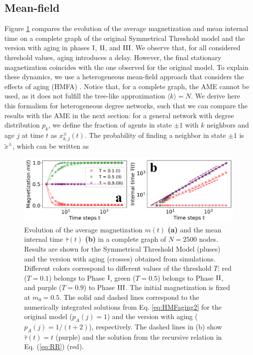\subsection{Mean-field}
Figure \ref{fig:COM_AGING} compares the evolution of the average magnetization and mean internal time on a complete graph of the original Symmetrical Threshold model and the version with aging in phases ${\rm I}$, ${\rm II}$, and ${\rm III}$. We observe that, for all considered threshold values, aging introduces a delay. However, the final stationary magnetization coincides with the one observed for the original model. To explain these dynamics, we use a heterogeneous mean-field approach that considers the effects of aging (HMFA) \cite{chen-2020}. Notice that, for a complete graph, the AME cannot be used, as it does not fulfill the tree-like approximation $\langle k \rangle = N$. We derive here this formalism for heterogeneous degree networks, such that we can compare the results with the AME in the next section: for a general network with degree distribution $p_k$, we define the fraction of agents in state $\pm 1$ with $k$ neighbors and age $j$ at time $t$ as $x^{\pm}_{k,j} (t)$. The probability of finding a neighbor in state $\pm 1$ is $\tilde{x}^{\pm}$, which can be written as 
\begin{figure}
	\centering \captionsetup{font=sf}
	\includegraphics[width=\textwidth]{Figs/Aging_STM/FIG4.pdf}
	\caption[Aging effects in the complete graph]{\label{fig:COM_AGING} Evolution of the average magnetization $m(t)$ \textbf{(a)} and the mean internal time $\bar{\tau}(t)$ \textbf{(b)} in a complete graph of $N=2500$ nodes. Results are shown for the Symmetrical Threshold Model (pluses) and the version with aging (crosses) obtained from simulations. Different colors correspond to different values of the threshold $T$: red ($T = 0.1$) belongs to Phase ${\rm I}$, green ($T = 0.5$) belongs to Phase ${\rm II}$, and purple ($T = 0.9$) to Phase ${\rm III}$. The initial magnetization is fixed at $m_0 = 0.5$. The solid and dashed lines correspond to the numerically integrated solutions from Eq. \ref{eq:HMFaging2} for the original model ($p_A(j) = 1$) and the version with aging ($p_A(j) = 1/(t+2)$), respectively. The dashed lines in (b) show $\bar{\tau}(t) = t$ (purple) and the solution from the recursive relation in Eq. (\ref{eq:RR}) (red).}
\end{figure}
